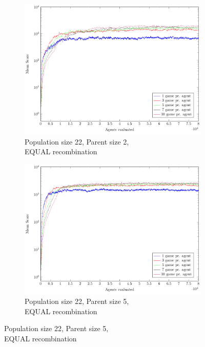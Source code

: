 \begin{figure}
    \centering
    \captionsetup[subfigure]{justification=centering}
    \begin{subfigure}[b]{0.49\textwidth}
    	\centering
        \caption{Population size 22, Parent size 2,\\EQUAL recombination}
        \includegraphics[width=\textwidth]{data/cma_population_offspring/22x_split/equal_l22_o2/mean/PlotFile.pdf}
    \end{subfigure} 
    \begin{subfigure}[b]{0.49\textwidth}
    	\centering
    	\caption{Population size 22, Parent size 5,\\EQUAL recombination}
        \includegraphics[width=\textwidth]{data/cma_population_offspring/22x_split/equal_l22_o5/mean/PlotFile.pdf}

\end{subfigure}
\end{figure}
